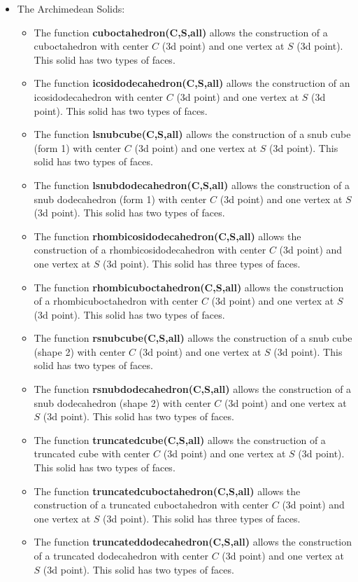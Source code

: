 \begin{itemize}
    \item The Archimedean Solids:
\begin{itemize}
    \item The function \textbf{cuboctahedron(C,S,all)} allows the construction of a cuboctahedron with center $C$ (3d point) and one vertex at $S$ (3d point). This solid has two types of faces.
    \item The function \textbf{icosidodecahedron(C,S,all)} allows the construction of an icosidodecahedron with center $C$ (3d point) and one vertex at $S$ (3d point). This solid has two types of faces.
    \item The function \textbf{lsnubcube(C,S,all)} allows the construction of a snub cube (form 1) with center $C$ (3d point) and one vertex at $S$ (3d point). This solid has two types of faces.
    \item The function \textbf{lsnubdodecahedron(C,S,all)} allows the construction of a snub dodecahedron (form 1) with center $C$ (3d point) and one vertex at $S$ (3d point). This solid has two types of faces.
    \item The function \textbf{rhombicosidodecahedron(C,S,all)} allows the construction of a rhombicosidodecahedron with center $C$ (3d point) and one vertex at $S$ (3d point). This solid has three types of faces.
    \item The function \textbf{rhombicuboctahedron(C,S,all)} allows the construction of a rhombicuboctahedron with center $C$ (3d point) and one vertex at $S$ (3d point). This solid has two types of faces.
    \item The function \textbf{rsnubcube(C,S,all)} allows the construction of a snub cube (shape 2) with center $C$ (3d point) and one vertex at $S$ (3d point). This solid has two types of faces.
    \item The function \textbf{rsnubdodecahedron(C,S,all)} allows the construction of a snub dodecahedron (shape 2) with center $C$ (3d point) and one vertex at $S$ (3d point). This solid has two types of faces.
    \item The function \textbf{truncatedcube(C,S,all)} allows the construction of a truncated cube with center $C$ (3d point) and one vertex at $S$ (3d point). This solid has two types of faces.
    \item The function \textbf{truncatedcuboctahedron(C,S,all)} allows the construction of a truncated cuboctahedron with center $C$ (3d point) and one vertex at $S$ (3d point). This solid has three types of faces.
    \item The function \textbf{truncateddodecahedron(C,S,all)} allows the construction of a truncated dodecahedron with center $C$ (3d point) and one vertex at $S$ (3d point). This solid has two types of faces.

\end{itemize}
\end{itemize}
